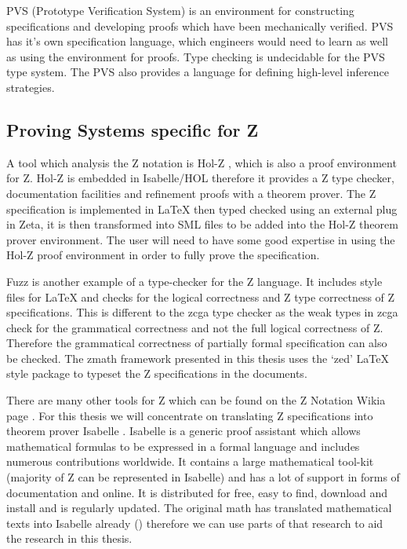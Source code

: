 PVS (Prototype Verification System) \cite{pvs} is an environment for
constructing specifications and developing proofs which have been mechanically
verified. PVS has it's own specification language, which engineers would need to
learn as well as using the environment for proofs. Type checking is undecidable
for the PVS type system. The PVS also provides a language for defining
high-level inference strategies.


\subsection{Proving Systems specific for Z}
\label{subsec:provingSystemsForZ}

A tool which analysis the Z notation is Hol-Z \cite{hol-z}, which is also a
proof environment for Z. Hol-Z is embedded in Isabelle/HOL therefore it provides
a Z type checker, documentation facilities and refinement proofs with a theorem
prover. The Z specification is implemented in \LaTeX{} then typed checked using
an external plug in Zeta, it is then transformed into SML files to be added into
the Hol-Z theorem prover environment. The user will need to have some good
expertise in using the Hol-Z proof environment in order to fully prove the
specification.

Fuzz \cite{spiveyfuzz} is another example of a type-checker for the Z language.
It includes style files for \LaTeX{} and checks for the logical correctness and
Z type correctness of Z specifications. This is different to the \gls{zcga} type
checker as the weak types in \gls{zcga} check for the grammatical correctness
and not the full logical correctness of Z. Therefore the grammatical correctness
of partially formal specification can also be checked. The \gls{zmath} framework
presented in this thesis uses the `zed' \LaTeX{} style package to typeset the Z
specifications in the documents.

There are many other tools for Z which can be found on the Z Notation Wikia page
\cite{zwikia}. For this thesis we will concentrate on translating Z
specifications into theorem prover Isabelle \cite{isabelle}. Isabelle is a
generic proof assistant which allows mathematical formulas to be expressed in a
formal language and includes numerous contributions worldwide. It contains a
large mathematical tool-kit (majority of Z can be represented in Isabelle) and
has a lot of support in forms of documentation and online. It is distributed for
free, easy to find, download and install and is regularly updated. The original
\gls{math} has translated mathematical texts into Isabelle already
(\cite{mathintoisa}) therefore we can use parts of that research to aid the
research in this thesis.

